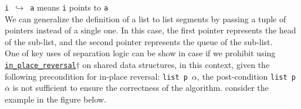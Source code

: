 \documentclass[11pt,a4paper]{report}
\begin{document}
\texttt{i $\hookrightarrow$ a} means \texttt{i} points to \texttt{a}\\

We can generalize the definition of a list to list segments by passing a tuple of pointers instead of a single one. In this case, the first pointer represents the head of the sub-list, and the second pointer represents the queue of the sub-list.\\
One of key uses of separation logic can be show in case if we prohibit using \hyperlink{reversal}{\texttt{in\_place\_reversal}$\dagger$} on shared data structures, in this context, given the following precondition for in-place reversal: \texttt{list p $\alpha$}, the post-condition \texttt{list p }$\overline{\alpha}$ is not sufficient to ensure the correctness of the algorithm. consider the example in the figure below.
\end{document}
